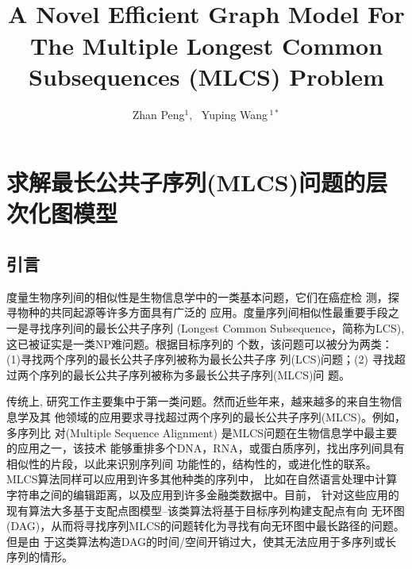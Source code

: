 \documentclass[utf8]{frontiersSCNS} %
\def\firstAuthorLast{Zhan Peng, Yuping Wang} %
\def\Authors{Zhan Peng$^1$, \, Yuping Wang\,$^{1*}$}
\begin{document}

\onecolumn
{}

\title[A Novel Graph Model For The MLCS Problem]{\\
  A Novel Efficient Graph Model For The Multiple Longest Common
  Subsequences (MLCS) Problem}

\author[\firstAuthorLast ]{\Authors} %
\address{} %
\correspondance{} %

\extraAuth{}%


\chapter{求解最长公共子序列(MLCS)问题的层次化图模型}


\section{引言}
\label{sec:introduction}

度量生物序列间的相似性是生物信息学中的一类基本问题，它们在癌症检
测\cite{Aravanis2017}，探寻物种的共同起源\cite{Zvelebil2007}等许多方面具有广泛的
应用。度量序列间相似性最重要手段之一是寻找序列间的最长公共子序列 (Longest Common
Subsequence，简称为LCS), 这已被证实是一类NP难问题\cite{Maier1978}。根据目标序列的
个数，该问题可以被分为两类：(1)寻找两个序列的最长公共子序列被称为最长公共子序
列(LCS)问题；(2) 寻找超过两个序列的最长公共子序列被称为多最长公共子序列(MLCS)问
题。

传统上, 研究工作主要集中于第一类问题。然而近些年来，越来越多的来自生物信息学及其
他领域的应用要求寻找超过两个序列的最长公共子序列(MLCS)。例如，多序列比
对(Multiple Sequence Alignment) 是MLCS问题在生物信息学中最主要的应用之一，该技术
能够重排多个DNA，RNA，或蛋白质序列，找出序列间具有相似性的片段，以此来识别序列间
功能性的，结构性的，或进化性的联系。 MLCS算法同样可以应用到许多其他种类的序列中，
比如在自然语言处理中计算字符串之间的编辑距离，以及应用到许多金融类数据中。目前，
针对这些应用的现有算法大多基于支配点图模型--该类算法将基于目标序列构建支配点有向
无环图(DAG)，从而将寻找序列MLCS的问题转化为寻找有向无环图中最长路径的问题。但是由
于这类算法构造DAG的时间/空间开销过大，使其无法应用于多序列或长序列的情形。
\end{document}
